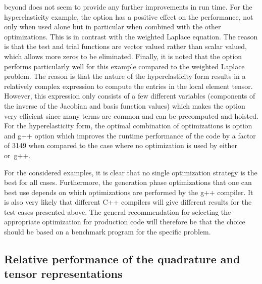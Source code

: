 beyond  does not seem to provide any further improvements in
run time.  For the hyperelasticity example, the option 
has a positive effect on the performance, not only when used alone
but in particular when combined with the other \ffc{} optimizations.
This is in contrast with the weighted Laplace equation. The reason is
that the test and trial functions are vector valued rather than scalar
valued, which allows more zeros to be eliminated.  Finally, it is noted
that the  option performs particularly well for this
example compared to the weighted Laplace problem.  The reason is that
the nature of the hyperelasticity form results in a relatively complex
expression to compute the entries in the local element tensor.  However,
this expression only consists of a few different variables (components
of the inverse of the Jacobian and basis function values) which makes
the  option very efficient since many terms are common
and can be precomputed and hoisted.  For the hyperelasticity form,
the optimal combination of optimizations is \ffc{} option  and g++ option  which improves the
runtime performance of the code by a factor of 3149 when compared to
the case where no optimization is used by either \ffc{} or~g++.

For the considered examples, it is clear that no single optimization
strategy is the best for all cases.  Furthermore, the generation phase
optimizations that one can best use depends on which optimizations are
performed by the g++ compiler.  It is also very likely that different C++
compilers will give different results for the test cases presented above.
The general recommendation for selecting the appropriate optimization
for production code will therefore be that the choice should be based
on a benchmark program for the specific problem.
\subsection{Relative performance of the quadrature and tensor representations}
\label{oelgaard-2:sec:performance_of_representations}

